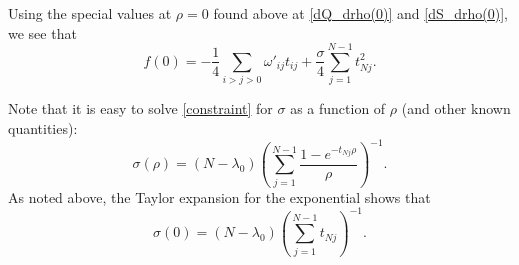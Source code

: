 \documentclass[12pt,leqno]{article}
\begin{document}
Using the special values at $\rho=0$ found above at \eqref{dQ_drho(0)} and \eqref{dS_drho(0)}, we see that
$$
f(0) = -\frac{1}{4}\sum_{i>j>0}\omega'_{ij}t_{ij} +\frac{\sigma}{4}\sum_{j=1}^{N-1}t_{Nj}^2.
$$


Note that it is easy to solve \eqref{constraint} for $\sigma$ as a function of $\rho$ (and other
known quantities):
\begin{equation}\label{eq4}
  \sigma(\rho) = (N - \lambda_0)\left(\sum_{j=1}^{N-1}\frac{1-e^{-t_{Nj}\rho}}{\rho}\right)^{-1}.
\end{equation}
As noted above, the Taylor expansion for the exponential shows that
$$
\sigma(0) = (N - \lambda_0)\left(\sum_{j=1}^{N-1}t_{Nj}\right)^{-1}.
$$



\end{document}
